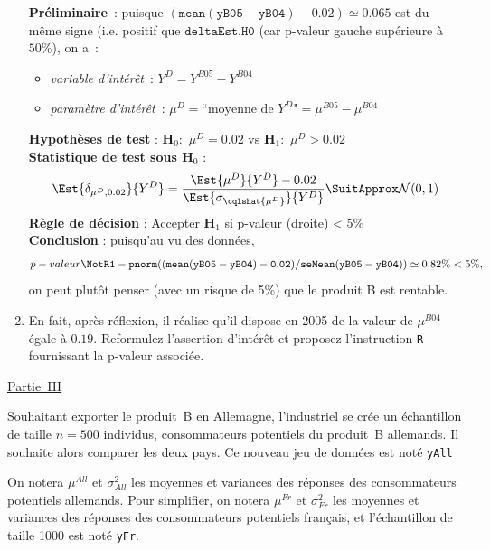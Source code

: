\documentclass[10pt]{report}
\begin{document}
\begin{exercice}
\begin{enumerate}
 

\begin{Correction}
\noindent \textbf{Préliminaire}~: puisque  $\mathtt{(mean(yB05-yB04)-0.02)}\simeq0.065$ est du même signe (i.e. positif que $\mathtt{deltaEst.H0}$ (car p-valeur gauche supérieure à $50\%$), on a~:
    \begin{itemize}
\item \textit{variable d'intérêt}~: $Y^{D}=Y^{B05}-Y^{B04}$
\item \textit{paramètre d'intérêt}~: $\mu^{D}=\mbox{``moyenne de $Y^{D}$"}=\mu^{B05}-\mu^{B04}$
\end{itemize}
\noindent \textbf{Hypothèses de test} : $\mathbf{H}_0:$ $\mu^{D}=0.02$ vs {\large $\mathbf{H}_1:$ $\mu^{D}>0.02$}\\
\textbf{Statistique de test sous $\mathbf{H}_0$} :
  $$
  \Est{\delta_{\mu^{D},0.02}}{Y^{D}}= {\displaystyle \frac{\Est{\mu^{D}}{Y^{D}}-0.02}{
\Est{\sigma_{\cqlshat{\mu^{D}}}}{Y^{D}}
}} 
  \SuitApprox \mathcal{N}(0,1)
  $$
\textbf{Règle de décision} : Accepter $\mathbf{H}_1$ si 
  p-valeur (droite) < 5\%\\
\noindent \textbf{Conclusion} :
puisqu'au vu des données, 
  \[
p-valeur\NotR\mathtt{1-pnorm((mean(yB05-yB04)-0.02)/seMean(yB05-yB04))} \simeq 0.82\% < 5\%,
\]
on peut plutôt penser (avec un risque de 5\%) que le produit B est rentable.
\end{Correction}




\item En fait, après réflexion, il réalise qu'il dispose  en 2005 de la valeur de $\mu^{B04}$ égale à $0.19$. Reformulez l'assertion d'intérêt et proposez l'instruction \texttt{R} fournissant la p-valeur associée.


\end{enumerate}

\noindent \underline{Partie~III}

Souhaitant exporter le produit~B en Allemagne, l'industriel se crée un échantillon de taille $n=500$ individus, consommateurs potentiels du produit~B allemands. Il souhaite alors comparer les deux pays. Ce nouveau jeu de données est noté \texttt{yAll}

On notera $\mu^{All}$ et $\sigma^2_{All}$ les moyennes et variances des réponses des consommateurs potentiels allemands. Pour simplifier, on notera $\mu^{Fr}$ et $\sigma^2_{Fr}$  les moyennes et variances des réponses des consommateurs potentiels français, et l'échantillon de taille 1000 est noté \texttt{yFr}. 


\end{exercice}
\end{document}
